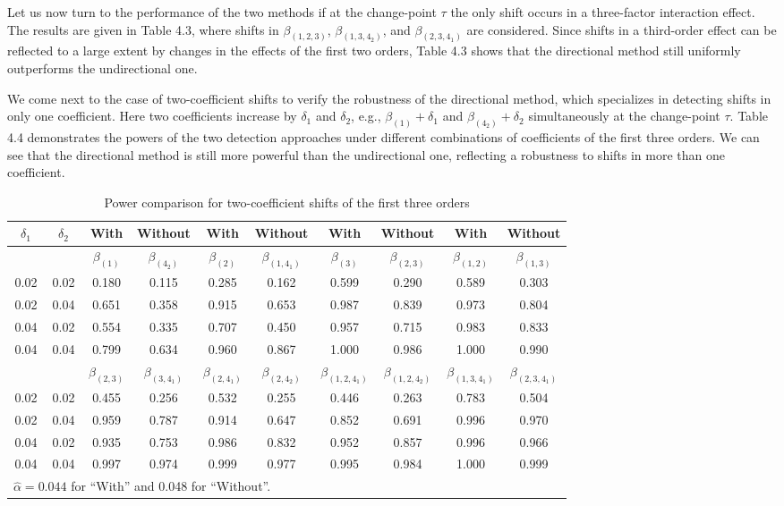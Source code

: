 Let us now turn to the performance of the two methods if at the change-point $\tau$
the only shift occurs in a three-factor interaction effect. The results are given in
Table 4.3, where shifts in $\beta_{(1,2,3)}$, $\beta_{(1,3,4_2)}$, and
$\beta_{(2,3,4_1)}$ are considered. Since shifts in a third-order effect can be
reflected to a large extent by changes in the effects of the first two orders, Table
4.3 shows that the directional method still uniformly outperforms the undirectional
one.

We come next to the case of two-coefficient shifts to verify the robustness of the
directional method, which specializes in detecting shifts in only one coefficient.
Here two coefficients increase by $\delta_1$ and $\delta_2$, e.g.,
$\beta_{(1)}+\delta_1$ and $\beta_{(4_2)}+\delta_2$ simultaneously at the
change-point $\tau$. Table 4.4 demonstrates the powers of the two detection
approaches under different combinations of coefficients of the first three orders.
We can see that the directional method is still more powerful than the undirectional
one, reflecting a robustness to shifts in more than one coefficient.

\begin{table}[!ht]
\tabcolsep 5.5pt \vspace{-0.1cm} \centering \caption{Power comparison for
two-coefficient shifts of the first three orders} \vspace{0.3cm}
\renewcommand{\arraystretch}{1.25}
\begin{tabular}{cc|cc|cc|cc|cc}\hline
\ $\delta_1$\  & \ $\delta_2$\  & With & Without & With & Without & With & Without &
With & Without
\\\hline
& & $\beta_{(1)}$ & $\beta_{(4_2)}$ & $\beta_{(2)}$ & $\beta_{(1,4_1)}$ &
$\beta_{(3)}$ & $\beta_{(2,3)}$ & $\beta_{(1,2)}$ & $\beta_{(1,3)}$
\\\hline
0.02 & 0.02 & 0.180 & 0.115 & 0.285 & 0.162 & 0.599 & 0.290 & 0.589 & 0.303 \\
0.02 & 0.04 & 0.651 & 0.358 & 0.915 & 0.653 & 0.987 & 0.839 & 0.973 & 0.804 \\
0.04 & 0.02 & 0.554 & 0.335 & 0.707 & 0.450 & 0.957 & 0.715 & 0.983 & 0.833 \\
0.04 & 0.04 & 0.799 & 0.634 & 0.960 & 0.867 & 1.000 & 0.986 & 1.000 & 0.990
\\\hline
& & $\beta_{(2,3)}$ & $\beta_{(3,4_1)}$ & $\beta_{(2,4_1)}$ & $\beta_{(2,4_2)}$ &
$\beta_{(1,2,4_1)}$ & $\beta_{(1,2,4_2)}$ & $\beta_{(1,3,4_1)}$ &
$\beta_{(2,3,4_1)}$
\\\hline
0.02 & 0.02 & 0.455 & 0.256 & 0.532 & 0.255 & 0.446 & 0.263 & 0.783 & 0.504 \\
0.02 & 0.04 & 0.959 & 0.787 & 0.914 & 0.647 & 0.852 & 0.691 & 0.996 & 0.970 \\
0.04 & 0.02 & 0.935 & 0.753 & 0.986 & 0.832 & 0.952 & 0.857 & 0.996 & 0.966 \\
0.04 & 0.04 & 0.997 & 0.974 & 0.999 & 0.977 & 0.995 & 0.984 & 1.000 & 0.999
\\\hline
\multicolumn{10}{l}{$\hat{\alpha}=0.044$ for ``With'' and 0.048 for ``Without''.}
\end{tabular}
\end{table}

